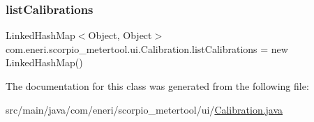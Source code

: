 \subsubsection{\texorpdfstring{list\+Calibrations}{listCalibrations}}
{\footnotesize\ttfamily Linked\+Hash\+Map$<$Object, Object$>$ com.\+eneri.\+scorpio\+\_\+metertool.\+ui.\+Calibration.\+list\+Calibrations = new Linked\+Hash\+Map()}



The documentation for this class was generated from the following file\+:\begin{DoxyCompactItemize}
\item 
src/main/java/com/eneri/scorpio\+\_\+metertool/ui/\hyperlink{_calibration_8java}{Calibration.\+java}\end{DoxyCompactItemize}
